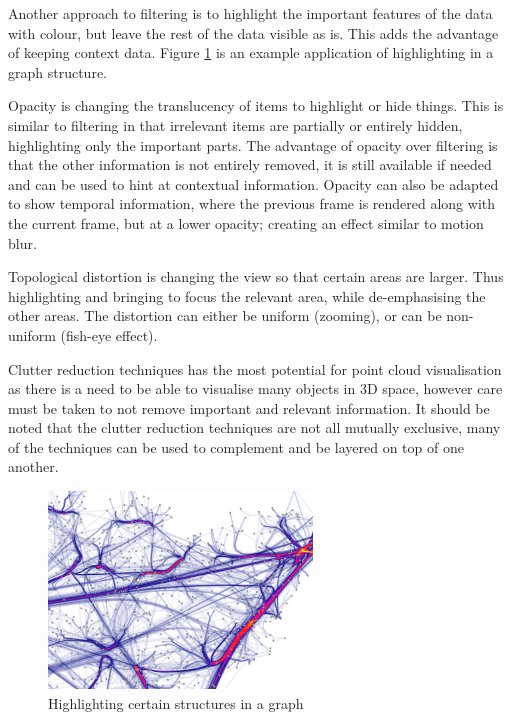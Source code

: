 Another approach to filtering is to highlight the important features of the
data with colour, but leave the rest of the data visible as is. This adds the
advantage of keeping context data. Figure \ref{fig:background_highlight} is an
example application of highlighting in a graph structure.

Opacity is changing the translucency of items to highlight or hide things. This
is similar to filtering in that irrelevant items are partially or entirely
hidden, highlighting only the important parts. The advantage of opacity over
filtering is that the other information is not entirely removed, it is still
available if needed and can be used to hint at contextual information. Opacity
can also be adapted to show temporal information, where the previous frame is
rendered along with the current frame, but at a lower opacity; creating an
effect similar to motion blur.

Topological distortion is changing the view so that certain areas are larger.
Thus highlighting and bringing to focus the relevant area, while de-emphasising
the other areas. The distortion can either be uniform (zooming), or can be
non-uniform (fish-eye effect).

Clutter reduction techniques has the most potential for point cloud
visualisation as there is a need to be able to visualise many objects in 3D
space, however care must be taken to not remove important and relevant
information. It should be noted that the clutter reduction techniques are not
all mutually exclusive, many of the techniques can be used to complement and be
layered on top of one another.

\begin{figure}[h!]
  \begin{center}
    \includegraphics[width=70mm]{graph_highlight}
  \end{center}
  \caption{Highlighting certain structures in a graph}
  \label{fig:background_highlight}
\end{figure}

